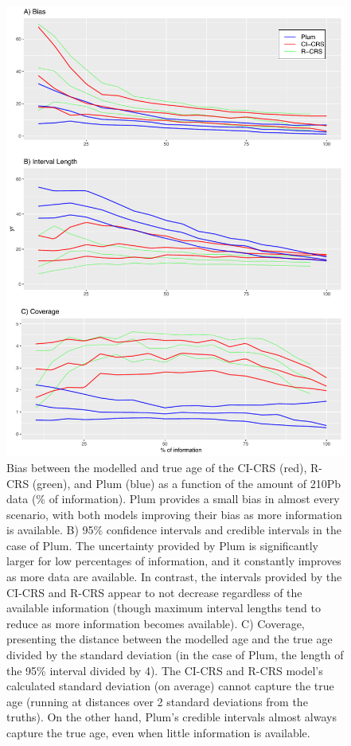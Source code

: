 \documentclass [10pt] {article}
\begin{document}
\begin{figure}[!]
 \centering
  \includegraphics[width=.65\linewidth]{AccPrec.pdf}
	\caption{Bias between the modelled and true age of the CI-CRS (red), R-CRS (green), and Plum (blue) as a function of the amount of 210Pb data (\% of information). Plum provides a small bias in almost every scenario, with both models improving their bias as more information is available. B) 95\% confidence intervals and credible intervals in the case of Plum. The uncertainty provided by Plum is significantly larger for low percentages of information, and it constantly improves as more data are available. In contrast, the intervals provided by the CI-CRS and R-CRS appear to not decrease regardless of the available information (though maximum interval lengths tend to reduce as more information becomes available). C) Coverage, presenting the distance between the modelled age and the true age divided by the standard deviation (in the case of Plum, the length of the 95\% interval divided by 4). The CI-CRS and R-CRS model's calculated standard deviation (on average) cannot capture the true age (running at distances over 2 standard deviations from the truths). On the other hand, Plum's credible intervals almost always capture the true age, even when little information is available.}
  \label{fig:accpre}
\end{figure}
\end{document}
